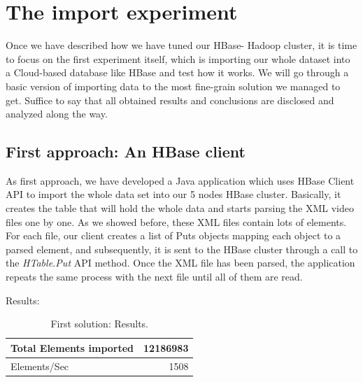 \section{The import experiment}

Once we have described how we have tuned our HBase- Hadoop cluster, it is time to focus on the first experiment itself, which is importing our whole dataset into a Cloud-based database like HBase and test how it works. We will go through a basic version of importing data to the most fine-grain solution we managed to get. Suffice to say that all obtained results and conclusions are disclosed and analyzed along the way.

\subsection{First approach: An HBase client}

As first approach, we have developed a Java application which uses HBase Client API to import the whole data set into our 5 nodes HBase cluster. Basically, it creates the table that will hold the whole data and starts parsing the XML video files one by one. As we showed before, these XML files contain lots of elements. For each file, our client creates a list of Puts objects mapping each object to a parsed element, and subsequently, it is sent to the HBase cluster through a call to the \textit{HTable.Put} API method. Once the XML file has been parsed, the application repeats the same process with the next file until all of them are read.

\bigskip

Results:

\bigskip



\begin{table}[htbp]
\begin{center}
\begin{tabular}{|l|r|}
\hline
Total Elements imported & 12186983 \\ \hline
Elements/Sec & 1508 \\ \hline
\end{tabular}
\caption{First solution: Results.}
\label{First solution: Results}
\end{center}
\end{table}





